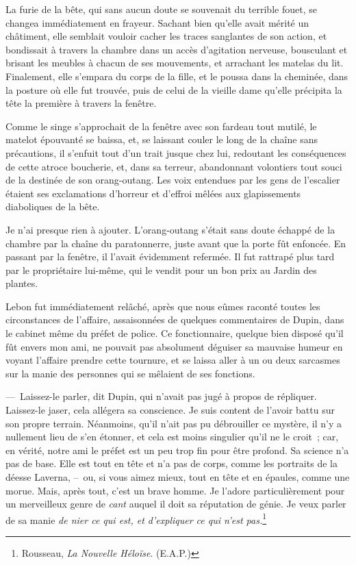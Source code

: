 \documentclass[french,twoside]{book} %
\begin{document}
La furie de la bête, qui sans aucun doute se souvenait du terrible fouet, se changea immédiatement en frayeur. Sachant bien qu’elle avait mérité un châtiment, elle semblait vouloir cacher les traces sanglantes de son action, et bondissait à travers la chambre dans un accès d’agitation nerveuse, bousculant et brisant les meubles à chacun de ses mouvements, et arrachant les matelas du lit. Finalement, elle s’empara du corps de la fille, et le poussa dans la cheminée, dans la posture où elle fut trouvée, puis de celui de la vieille dame qu’elle précipita la tête la première à travers la fenêtre.\par
Comme le singe s’approchait de la fenêtre avec son fardeau tout mutilé, le matelot épouvanté se baissa, et, se laissant couler le long de la chaîne sans précautions, il s’enfuit tout d’un trait jusque chez lui, redoutant les conséquences de cette atroce boucherie, et, dans sa terreur, abandonnant volontiers tout souci de la destinée de son orang-outang. Les voix entendues par les gens de l’escalier étaient ses exclamations d’horreur et d’effroi mêlées aux glapissements diaboliques de la bête.\par
Je n’ai presque rien à ajouter. L’orang-outang s’était sans doute échappé de la chambre par la chaîne du paratonnerre, juste avant que la porte fût enfoncée. En passant par la fenêtre, il l’avait évidemment refermée. Il fut rattrapé plus tard par le propriétaire lui-même, qui le vendit pour un bon prix au Jardin des plantes.\par
Lebon fut immédiatement relâché, après que nous eûmes raconté toutes les circonstances de l’affaire, assaisonnées de quelques commentaires de Dupin, dans le cabinet même du préfet de police. Ce fonctionnaire, quelque bien disposé qu’il fût envers mon ami, ne pouvait pas absolument déguiser sa mauvaise humeur en voyant l’affaire prendre cette tournure, et se laissa aller à un ou deux sarcasmes sur la manie des personnes qui se mêlaient de ses fonctions.\par
— Laissez-le parler, dit Dupin, qui n’avait pas jugé à propos de répliquer. Laissez-le jaser, cela allégera sa conscience. Je suis content de l’avoir battu sur son propre terrain. Néanmoins, qu’il n’ait pas pu débrouiller ce mystère, il n’y a nullement lieu de s’en étonner, et cela est moins singulier qu’il ne le croit ; car, en vérité, notre ami le préfet est un peu trop fin pour être profond. Sa science n’a pas de base. Elle est tout en tête et n’a pas de corps, comme les portraits de la déesse Laverna, – ou, si vous aimez mieux, tout en tête et en épaules, comme une morue. Mais, après tout, c’est un brave homme. Je l’adore particulièrement pour un merveilleux genre de \emph{cant} auquel il doit sa réputation de génie. Je veux parler de sa manie \emph{de nier ce qui est, et d’expliquer ce qui n’est pas.}\footnote{Rousseau, \emph{La Nouvelle Héloïse}. (E.A.P.)}
\end{document}
